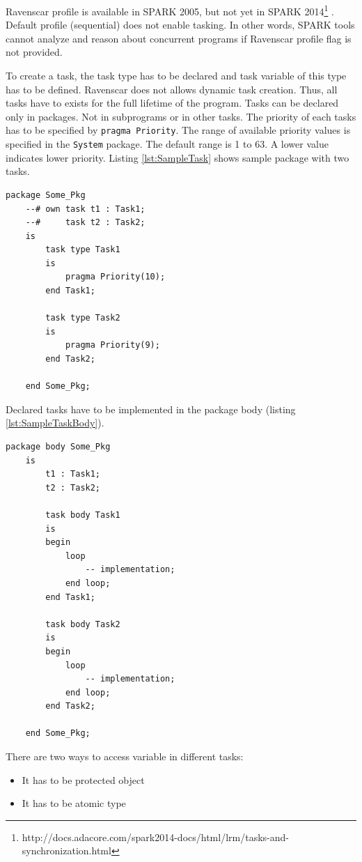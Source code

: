Ravenscar profile is available in SPARK 2005, but not yet in SPARK 2014\footnote{http://docs.adacore.com/spark2014-docs/html/lrm/tasks-and-synchronization.html} \cite{Spark2014refManual:Online}. Default profile (sequential) does not enable tasking. In other words, SPARK tools cannot analyze and reason about concurrent programs if Ravenscar profile flag is not provided.

To create a task, the task type has to be declared and task variable of this type has to be defined. Ravenscar does not allows dynamic task creation. Thus, all tasks have to exists for the full lifetime of the program. \cite{IssuesWithRavenscar:Paper} Tasks can be declared only in packages. Not in subprograms or in other tasks. \cite{Barnes:Book} The priority of each tasks has to be specified by \lstinline{pragma Priority}. The range of available priority values is specified in the \lstinline{System} package. The default range is 1 to 63. A lower value indicates lower priority. Listing \ref{lst:SampleTask} shows sample package with two tasks.

\singlespacing
\begin{lstlisting}[frame=single, gobble=0, caption={Sample tasks}, label={lst:SampleTask}]
	package Some_Pkg
	--# own task t1 : Task1;
	--#     task t2 : Task2;
	is
		task type Task1
		is
			pragma Priority(10);
		end Task1;

		task type Task2
		is
			pragma Priority(9);
		end Task2;

	end Some_Pkg;
\end{lstlisting} 
\doublespacing


Declared tasks have to be implemented in the package body (listing \ref{lst:SampleTaskBody}).

\singlespacing
\begin{lstlisting}[frame=single, gobble=0, caption={Sample tasks body}, label={lst:SampleTaskBody}]
	package body Some_Pkg
	is
		t1 : Task1;
		t2 : Task2;

		task body Task1
		is
		begin
			loop
				-- implementation;
			end loop;
		end Task1;

		task body Task2
		is
		begin
			loop
				-- implementation;
			end loop;
		end Task2;

	end Some_Pkg;
\end{lstlisting} 
\doublespacing

There are two ways to access variable in different tasks:
\begin{itemize}
    \item It has to be protected object
    \item It has to be atomic type
\end{itemize}

